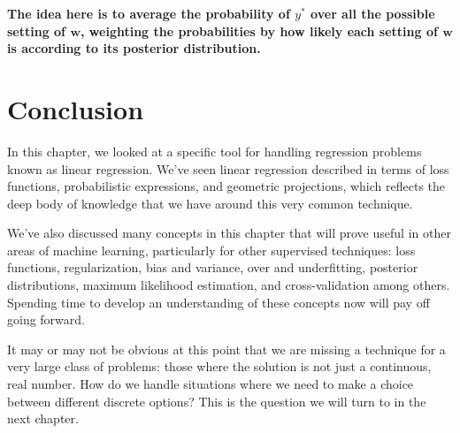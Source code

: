 \textbf{The idea here is to average the probability of $y^*$ over all the possible setting of $\mathbf{w}$, weighting the probabilities by how likely each setting of $\mathbf{w}$ is according to its posterior distribution.}

\section{Conclusion}
In this chapter, we looked at a specific tool for handling regression problems known as linear regression. We've seen linear regression described in terms of loss functions, probabilistic expressions, and geometric projections, which reflects the deep body of knowledge that we have around this very common technique.

We've also discussed many concepts in this chapter that will prove useful in other areas of machine learning, particularly for other supervised techniques: loss functions, regularization, bias and variance, over and underfitting, posterior distributions, maximum likelihood estimation, and cross-validation among others. Spending time to develop an understanding of these concepts now will pay off going forward.

It may or may not be obvious at this point that we are missing a technique for a very large class of problems: those where the solution is not just a continuous, real number. How do we handle situations where we need to make a choice between different discrete options? This is the question we will turn to in the next chapter.
